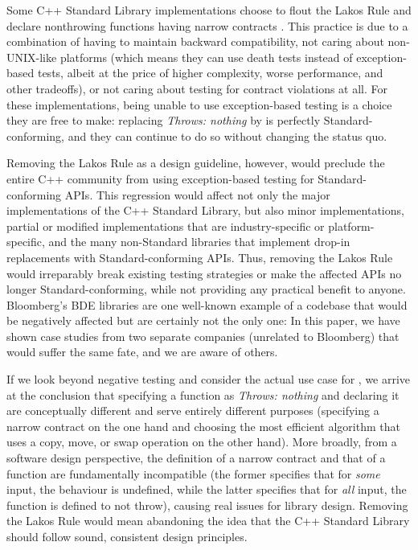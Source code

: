 Some C++ Standard Library implementations choose to flout the Lakos Rule and declare nonthrowing functions having narrow contracts . This practice is due to a combination of having to maintain backward compatibility, not caring about non-UNIX-like platforms (which means they can use death tests instead of exception-based tests, albeit at the price of higher complexity, worse performance, and other tradeoffs), or not caring about testing for contract violations at all. For these implementations, being unable to use exception-based testing is a choice they are free to make: replacing \emph{Throws: nothing} by  is perfectly Standard-conforming, and they can continue to do so without changing the status quo.

Removing the Lakos Rule as a design guideline, however, would preclude the entire C++ community from using exception-based testing for Standard-conforming APIs. This regression would affect not only the major implementations of the C++ Standard Library, but also minor implementations, partial or modified implementations that are industry-specific or platform-specific, and the many non-Standard libraries that implement drop-in replacements with Standard-conforming APIs. Thus, removing the Lakos Rule would irreparably break existing testing strategies or make the affected APIs no longer Standard-conforming, while not providing any practical benefit to anyone. Bloomberg's BDE libraries are one well-known example of a codebase that would be negatively affected but are certainly not the only one: In this paper, we have shown case studies from two separate companies (unrelated to Bloomberg) that would suffer the same fate, and we are aware of others.

If we look beyond negative testing and consider the actual use case for , we arrive at the conclusion that specifying a function as \emph{Throws: nothing} and declaring it  are conceptually different and serve entirely different purposes (specifying a narrow contract on the one hand and choosing the most efficient algorithm that uses a copy, move, or swap operation on the other hand). More broadly, from a software design perspective, the definition of a narrow contract and that of a  function are fundamentally incompatible (the former specifies that for \emph{some} input, the behaviour is undefined, while the latter specifies that for \emph{all} input, the function is defined to not throw), causing real issues for library design. Removing the Lakos Rule would mean abandoning the idea that the C++ Standard Library should follow sound, consistent design principles.

